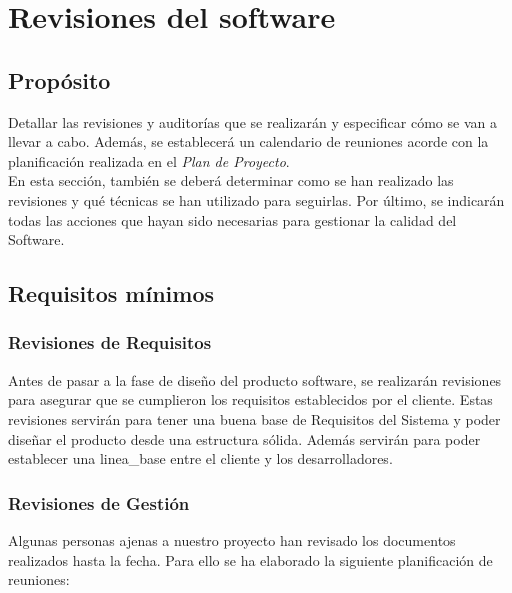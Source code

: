 \documentclass[11pt, a4paper, twoside, titlepage]{article}
\begin{document}
	\section{Revisiones del software} %

		\subsection{Propósito}
			Detallar las revisiones y auditorías que se realizarán y especificar cómo se van a llevar a cabo. Además, se establecerá un calendario de reuniones acorde con la planificación realizada en el \textit{Plan de Proyecto}. \\
			
			En esta sección, también se deberá determinar como se han realizado las revisiones y qué técnicas se han utilizado para seguirlas. Por último, se indicarán todas las acciones que hayan sido necesarias para gestionar la calidad del Software.

		\subsection{Requisitos mínimos}
			\subsubsection{Revisiones de Requisitos}
				Antes de pasar a la fase de diseño del producto software, se realizarán revisiones para asegurar que se cumplieron los requisitos establecidos por el cliente. Estas revisiones servirán para tener una buena base de Requisitos del Sistema y poder diseñar el producto desde una estructura sólida.
 Además servirán para poder establecer una \gls{linea_base} entre el cliente y los desarrolladores. 
				
			\subsubsection{Revisiones de Gestión}
			Algunas personas ajenas a nuestro proyecto han revisado los documentos realizados hasta la fecha. Para ello se ha elaborado la siguiente planificación de reuniones: \\
			
\end{document}

